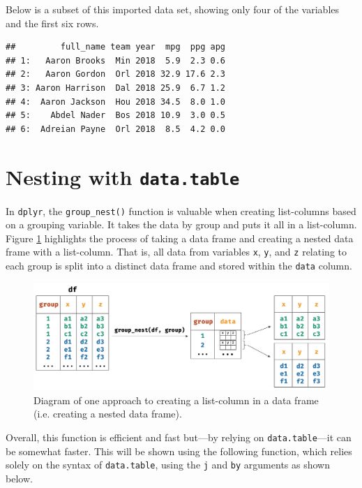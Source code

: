 \documentclass[doc,floatsintext]{apa6}
\begin{document}
\noindent Below is a subset of this imported data set, showing only four of the variables and the first six rows.

\begin{verbatim}
##         full_name team year  mpg  ppg apg
## 1:   Aaron Brooks  Min 2018  5.9  2.3 0.6
## 2:   Aaron Gordon  Orl 2018 32.9 17.6 2.3
## 3: Aaron Harrison  Dal 2018 25.9  6.7 1.2
## 4:  Aaron Jackson  Hou 2018 34.5  8.0 1.0
## 5:    Abdel Nader  Bos 2018 10.9  3.0 0.5
## 6:  Adreian Payne  Orl 2018  8.5  4.2 0.0
\end{verbatim}

\hypertarget{nesting-with-data.table}{%
\section{\texorpdfstring{Nesting with \texttt{data.table}}{Nesting with data.table}}\label{nesting-with-data.table}}

In \texttt{dplyr}, the \texttt{group\_nest()} function is valuable when creating list-columns based on a grouping variable. It takes the data by group and puts it all in a list-column. Figure \ref{process} highlights the process of taking a data frame and creating a nested data frame with a list-column. That is, all data from variables \texttt{x}, \texttt{y}, and \texttt{z} relating to each group is split into a distinct data frame and stored within the \texttt{data} column.

\begin{figure}[b]
  \centering
  \includegraphics[width=\textwidth]{fig_process.png}
  \caption{Diagram of one approach to creating a list-column in a data frame (i.e. creating a nested data frame).}
  \label{process}
\end{figure}

Overall, this function is efficient and fast but---by relying on \texttt{data.table}---it can be somewhat faster. This will be shown using the following function, which relies solely on the syntax of \texttt{data.table}, using the \texttt{j} and \texttt{by} arguments as shown below.
\end{document}
